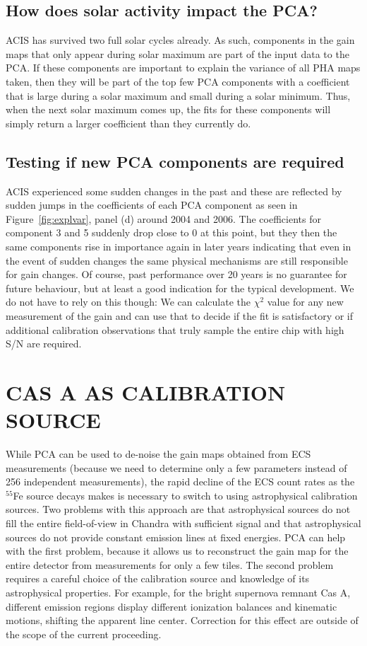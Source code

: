 \documentclass[]{spie}  %
\begin{document}
\subsection{How does solar activity impact the PCA?}
ACIS has survived two full solar cycles already. As such, components in the gain maps that only appear during solar maximum are part of the input data to the PCA. If these components are important to explain the variance of all PHA maps taken, then they will be part of the top few PCA components with a coefficient that is large during a solar maximum and small during a solar minimum. Thus, when the next solar maximum comes up, the fits for these components will simply return a larger coefficient than they currently do.

\subsection{Testing if new PCA components are required}
ACIS experienced some sudden changes in the past and these are reflected by sudden jumps in the coefficients of each PCA component as seen in Figure~\ref{fig:explvar}, panel (d) around 2004 and 2006. The coefficients for component 3 and 5 suddenly drop close to 0 at this point, but they then the same components rise in importance again in later years indicating that even in the event of sudden changes the same physical mechanisms are still responsible for gain changes. Of course, past performance over 20 years is no guarantee for future behaviour, but at least a good indication for the typical development. We do not have to rely on this though: We can calculate the $\chi^2$ value for any new measurement of the gain and can use that to decide if the fit is satisfactory or if additional calibration observations that truly sample the entire chip with high S/N are required.

\section{CAS A AS CALIBRATION SOURCE}
While PCA can be used to de-noise the gain maps obtained from ECS measurements (because we need to determine only a few parameters instead of 256 independent measurements), the rapid decline of the ECS count rates as the $^{55}$Fe source decays makes is necessary to switch to using astrophysical calibration sources. Two problems with this approach are that astrophysical sources do not fill the entire field-of-view in Chandra with sufficient signal and that astrophysical sources do not provide constant emission lines at fixed energies. PCA can help with the first problem, because it allows us to reconstruct the gain map for the entire detector from measurements for only a few tiles. The second problem requires a careful choice of the calibration source and knowledge of its astrophysical properties. For example, for the bright supernova remnant Cas A, different emission regions display different ionization balances and kinematic motions, shifting the apparent line center\cite{2010ApJ...725.2038D,2012ApJ...746..130H}. Correction for this effect are outside of the scope of the current proceeding.
\end{document}
